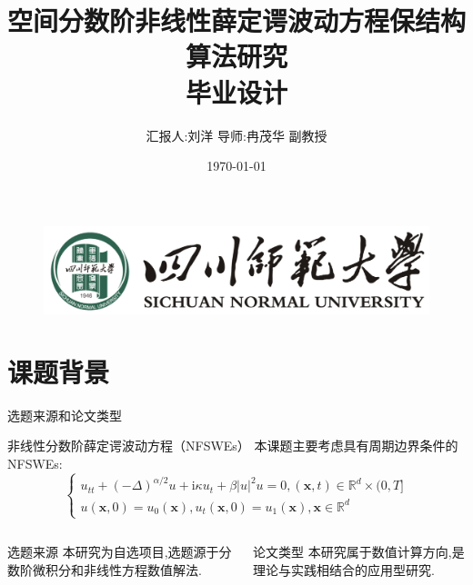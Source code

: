 \documentclass[aspectratio=169]{beamer}
\title[空间分数阶非线性薛定谔波动方程保结构算法研究
]{\small 空间分数阶非线性薛定谔波动方程保结构算法研究\\[2mm] 毕业设计}
\author[刘洋]{\footnotesize 汇报人:刘洋 \quad 导师:冉茂华 副教授}
\institute[四川师范大学偏微分方程与物理团队]{\footnotesize 四川师范大学偏微分方程与物理团队}
\date{\footnotesize \vskip -10pt \today}
\begin{document}
\kaishu
\begin{frame}
	\titlepage
	\vspace{-2mm}
	\begin{figure}[htpb]
		\begin{center}
			\includegraphics[width=0.45\linewidth]{pic/SICNU_Logo2.png}
		\end{center}
	\end{figure}
\end{frame}
\begin{frame}
\tableofcontents[sectionstyle=show,subsectionstyle=show/shaded/hide,subsubsectionstyle=show/shaded/hide]
\end{frame}

\section{课题背景}
\begin{frame}{选题来源和论文类型}
	\begin{block}{非线性分数阶薛定谔波动方程（NFSWEs）}
		本课题主要考虑具有周期边界条件的 NFSWEs:
		\begin{equation}
			\left\{\begin{array}{l}
				u_{t t}+(-\Delta)^{\alpha / 2} u+\mathrm{i} \kappa u_t+\beta|u|^2 u=0,(\boldsymbol{x}, t) \in \mathbb{R}^d \times(0, T] \\
				u(\boldsymbol{x}, 0)=u_0(\boldsymbol{x}), u_t(\boldsymbol{x}, 0)=u_1(\boldsymbol{x}), \boldsymbol{x} \in \mathbb{R}^d
				\end{array}\right.\tag{8}
		\end{equation}
	  \end{block}

	  \begin{columns}
		\begin{column}{0.45\textwidth}
		  \begin{block}{选题来源}
			本研究为自选项目,选题源于分数阶微积分和非线性方程数值解法.
		  \end{block}
		\end{column}
		\begin{column}{0.45\textwidth}
		  \begin{block}{论文类型}
			本研究属于数值计算方向,是理论与实践相结合的应用型研究.	
		  \end{block}
		\end{column}
	  \end{columns}

\end{frame}
\end{document}
